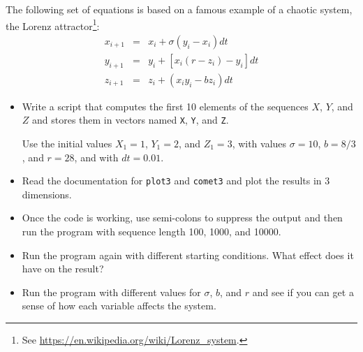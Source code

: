 \begin{ex}
The following set of equations is based on a famous example of a chaotic system, the Lorenz attractor\footnote{See \url{https://en.wikipedia.org/wiki/Lorenz_system}.}:
%
\begin{eqnarray}
x_{i+1} &=& x_i + \sigma \left( y_i - x_i \right) dt  \\
y_{i+1} &=& y_i + \left[ x_i (r - z_i) - y_i \right] dt   \\
z_{i+1} &=& z_i + \left( x_i y_i - b z_i \right) dt
\end{eqnarray}
%
\begin{itemize}

\item Write a script that computes the first 10 elements of the sequences
$X$, $Y$, and $Z$ and stores them in vectors named {\tt X}, {\tt Y},
and {\tt Z}.

Use the initial values $X_1 = 1$, $Y_1 = 2$, and $Z_1 = 3$, with values
$\sigma = 10$, $b = 8/3$, and $r = 28$, and with $dt = 0.01$.

\item Read the documentation for {\tt plot3} and {\tt comet3} and
plot the results in 3 dimensions.

\item Once the code is working, use semi-colons to suppress the output
and then run the program with sequence length 100, 1000, and 10000.

\item Run the program again with different starting conditions.
What effect does it have on the result?

\item Run the program with different values for $\sigma$, $b$, and $r$
and see if you can get a sense of how each variable affects the
system.

\end{itemize}

\end{ex}


